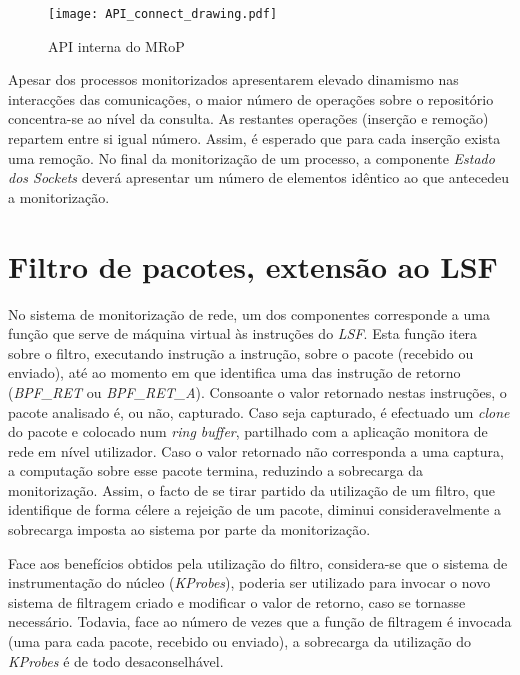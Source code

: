 \begin{figure}[!htbp]
\centering
\texttt{[image: API\_connect\_drawing.pdf]}
\caption{API interna do MRoP}
\label{fig:api_connect}
\end{figure}

 Apesar dos processos monitorizados apresentarem elevado dinamismo nas interacções das comunicações, o maior número de operações sobre o repositório concentra-se ao nível da consulta.
As restantes operações (inserção e remoção) repartem entre si igual número.
Assim, é esperado que para cada inserção exista uma remoção.
No final da monitorização de um processo, a componente \textit{Estado dos Sockets} deverá apresentar um número de elementos idêntico ao que antecedeu a monitorização.





\section{Filtro de pacotes, extensão ao LSF}

No sistema de monitorização de rede, um dos componentes corresponde a uma função que serve de máquina virtual às instruções do \textit{LSF}.
Esta função itera sobre o filtro, executando instrução a instrução, sobre o pacote (recebido ou enviado), até ao momento em que identifica uma das instrução de retorno (\textit{BPF\_RET} ou \textit{BPF\_RET\_A}).
Consoante o valor retornado nestas instruções, o pacote analisado é, ou não, capturado.
Caso seja capturado, é efectuado um \textit{clone} do pacote e colocado num \textit{ring buffer}, partilhado com a aplicação monitora de rede em nível utilizador.
Caso o valor retornado não corresponda a uma captura, a computação sobre esse pacote termina, reduzindo a sobrecarga da monitorização.
Assim, o facto de se tirar partido da utilização de um filtro, que identifique de forma célere a rejeição de um pacote, diminui consideravelmente a sobrecarga imposta ao sistema por parte da monitorização.

Face aos benefícios obtidos pela utilização do filtro, considera-se que o sistema de instrumentação do núcleo (\textit{KProbes}), poderia ser utilizado para invocar o novo sistema de filtragem criado e modificar o valor de retorno, caso se tornasse necessário.
Todavia, face ao número de vezes que a função de filtragem é invocada (uma para cada pacote, recebido ou enviado), a sobrecarga da utilização do \textit{KProbes} é de todo desaconselhável.

